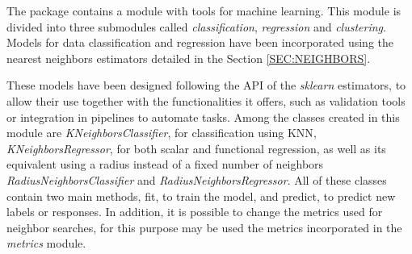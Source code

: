 

The package contains a module with tools for machine learning.
This module is divided into three submodules called \textit{classification},
\textit{regression} and \textit{clustering}.
Models for data classification and regression have been incorporated using
the nearest neighbors estimators detailed in the Section \ref{SEC:NEIGHBORS}.

These models have been designed following the \acs{API} of the \textit{sklearn} estimators,
to allow their use together with the functionalities it offers, such as
validation tools or integration in pipelines to automate tasks.
Among the classes created in this module are \textit{KNeighborsClassifier},
for classification using \acs{KNN}, \textit{KNeighborsRegressor},
for both scalar and functional regression,
as well as its equivalent using a radius instead of a fixed number of neighbors
\textit{RadiusNeighborsClassifier} and \textit{RadiusNeighborsRegressor}.
All of these classes contain two main methods, fit, to train the model,
and predict, to predict new labels or responses.
In addition, it is possible to change the metrics used for neighbor searches,
for this purpose  may be used the metrics incorporated in the \textit{metrics}
module.
